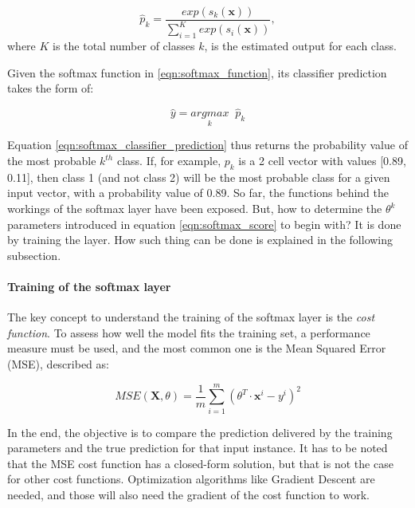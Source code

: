 \documentclass[../main.tex]{subfiles}
\begin{document}
\begin{equation} \label{eqn:softmax_function}
    \hat{p}_k = \frac{exp(s_{k}(\textbf{x}))}{\sum_{i=1}^{K} exp(s_{i}(\textbf{x}))}, 
\end{equation}
where $K$ is the total number of classes $k$, is the estimated output for each class.

Given the softmax function in \ref{eqn:softmax_function}, its classifier prediction takes the form of:

\begin{equation} \label{eqn:softmax_classifier_prediction}
    \hat{y} = \underset{k}{argmax} \; \; \hat{p}_k
\end{equation}

Equation \ref{eqn:softmax_classifier_prediction} thus returns the probability value of the most probable $k^{th}$ class. If, for example, $p_k$ is a 2 cell vector with values [0.89, 0.11], then class 1 (and not class 2) will be the most probable class for a given input vector, with a probability value of 0.89. So far, the functions behind the workings of the softmax layer have been exposed. But, how to determine the $\theta^{k}$ parameters introduced in equation \ref{eqn:softmax_score} to begin with? It is done by training the layer. How such thing can be done is explained in the following subsection.

\paragraph{Training of the softmax layer}
The key concept to understand the training of the softmax layer is the \textit{cost function}. To assess how well the model fits the training set, a performance measure must be used, and the most common one is the Mean Squared Error (MSE), described as: 

\begin{equation} \label{eqn:MSE_cost_function}
    MSE(\textbf{X}, \theta) = \frac{1}{m} \sum_{i=1}^{m} (\theta^T \cdot \textbf{x}^{i} - y^{i})^2
\end{equation}

In the end, the objective is to compare the prediction delivered by the training parameters and the true prediction for that input instance. It has to be noted that the MSE cost function has a closed-form solution, but that is not the case for other cost functions. Optimization algorithms like Gradient Descent are needed, and those will also need the gradient of the cost function to work.
\end{document}
